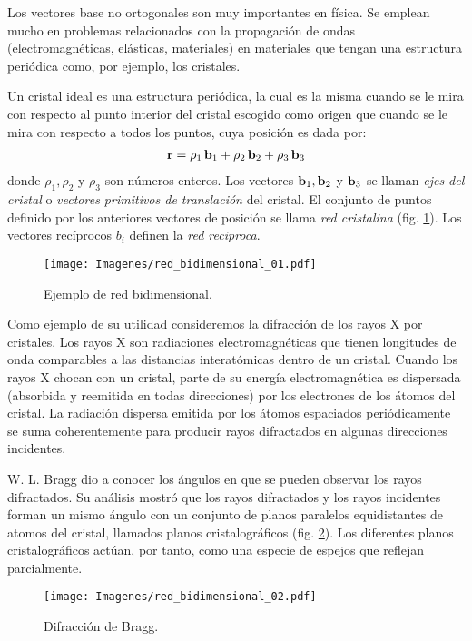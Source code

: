 Los vectores base no ortogonales son muy importantes en física. Se emplean mucho en problemas relacionados con la propagación de ondas (electromagnéticas, elásticas, materiales) en materiales que tengan una estructura periódica como, por ejemplo, los cristales.
\par
Un cristal ideal es una estructura periódica, la cual es la misma cuando se le mira con respecto al punto interior del cristal escogido como origen que cuando se le mira con respecto a todos los puntos, cuya posición es dada por:
\begin{align*}
    \vb{r} = \rho_{1} \, \vb{b}_{1} + \rho_{2} \, \vb{b}_{2} + \rho_{3} \, \vb{b}_{3}
\end{align*}
donde $\rho_{1}, \rho_{2}$ y $\rho_{3}$ son números enteros. Los vectores $\vb{b}_{1}, \vb{b}_{2}$ y $\vb{b}_{3}$ se llaman \emph{ejes del cristal} o \emph{vectores primitivos de translación} del cristal. El conjunto de puntos definido por los anteriores vectores de posición se llama \emph{red cristalina} (fig. \ref{fig:figura_01_14}). Los vectores recíprocos $b_{i}$ definen la \emph{red reciproca}. 
\begin{figure}[H]
    \centering
    \texttt{[image: Imagenes/red\_bidimensional\_01.pdf]}
    \caption{Ejemplo de red bidimensional.}
    \label{fig:figura_01_14}
\end{figure}
Como ejemplo de su utilidad consideremos la difracción de los rayos X por cristales. Los rayos X son radiaciones electromagnéticas que tienen longitudes de onda comparables a las distancias interatómicas dentro de un cristal. Cuando los rayos X chocan con un cristal, parte de su energía electromagnética es dispersada (absorbida y reemitida en todas direcciones) por los electrones de los átomos del cristal. La radiación dispersa emitida por los átomos espaciados periódicamente se suma coherentemente para producir rayos difractados en algunas direcciones incidentes. 
\par
W. L. Bragg dio a conocer los ángulos en que se pueden observar los rayos difractados. Su análisis mostró que los rayos difractados y los rayos incidentes forman un mismo ángulo con un conjunto de planos paralelos equidistantes de atomos del cristal, llamados planos cristalográficos (fig. \ref{fig:figura_01_15}). Los diferentes planos cristalográficos actúan, por tanto, como una especie de espejos que reflejan parcialmente. 
\begin{figure}[H]
    \centering
    \texttt{[image: Imagenes/red\_bidimensional\_02.pdf]}
    \caption{Difracción de Bragg.}
    \label{fig:figura_01_15}
\end{figure}
